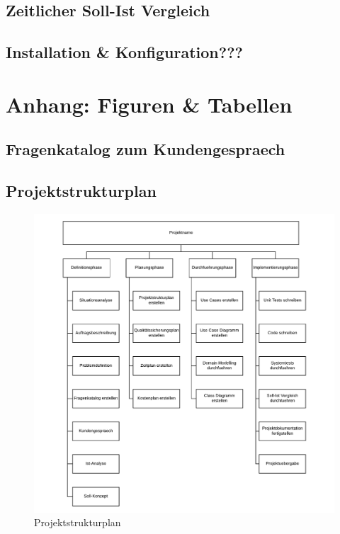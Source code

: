 \documentclass[11pt, a4paper]{article}
\begin{document}
    \subsection{Zeitlicher Soll-Ist Vergleich}
    \subsection{Installation \& Konfiguration???}
    \newpage

    \begin{appendix}
      \listoffigures
      \listoftables
    \end{appendix}
    \newpage

  \section{Anhang: Figuren \& Tabellen}
    \subsection{Fragenkatalog zum Kundengespraech}
      \newpage
    \subsection{Projektstrukturplan}
      \begin{figure}[h!]
        \includegraphics[width=\linewidth]{fig/Projektstrukturplan.pdf}
        \caption{Projektstrukturplan}
        \label{fig:psp}
      \end{figure}
      \newpage
\end{document}
